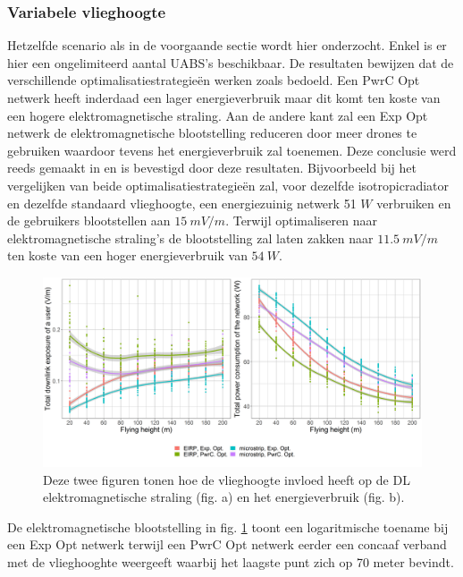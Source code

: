 \documentclass[twocolumn]{phdsymp_dutch}
\begin{document}
\subsubsection{Variabele vlieghoogte}
Hetzelfde scenario als in de voorgaande sectie wordt hier onderzocht. Enkel is er hier een ongelimiteerd aantal 
\gls{UABS}'s beschikbaar. De resultaten bewijzen dat de verschillende optimalisatiestrategie\"en werken zoals bedoeld.
Een \gls{PwrC Opt} netwerk heeft inderdaad een lager energieverbruik maar dit komt ten koste van een hogere elektromagnetische straling.
Aan de andere kant zal een  \gls{Exp Opt} netwerk de elektromagnetische blootstelling reduceren door meer drones te gebruiken waardoor tevens 
het energieverbruik zal toenemen. Deze conclusie werd reeds gemaakt in \cite{J1} en is bevestigd door deze resultaten.
Bijvoorbeeld bij het vergelijken van beide optimalisatiestrategieën zal, voor dezelfde
\gls{isotropicradiator} en dezelfde standaard vlieghoogte, een energiezuinig netwerk 51 $W$ verbruiken
en de gebruikers blootstellen aan $15\ mV/m$.
Terwijl optimaliseren naar elektromagnetische straling's de blootstelling zal laten zakken naar 
$11.5\ mV/m$ ten koste van een hoger energieverbruik van $54\ W$.

\begin{figure}[h!]
  \includegraphics[width=\linewidth]{../results/s3/fhvsdlAndPc.png}
  \caption{Deze twee figuren tonen hoe de vlieghoogte invloed heeft op de \acs{DL} elektromagnetische straling (fig. a) en het energieverbruik (fig. b).}
  \label{fig:s3a_dlAndPc}
\end{figure}

De elektromagnetische blootstelling in fig. \ref{fig:s3a_dlAndPc} toont een logaritmische toename bij een 
\gls{Exp Opt} netwerk terwijl een \gls{PwrC Opt} netwerk eerder een concaaf verband met de vlieghooghte weergeeft 
waarbij het laagste punt zich op 70 meter bevindt.
\end{document}
